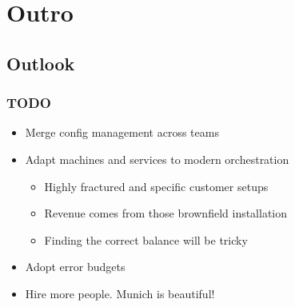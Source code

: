 \documentclass[t]{beamer}
\begin{document}


\section{Outro}

\subsection{Outlook}

\begin{frame}
	\frametitle{TODO}
	\begin{itemize}
		\item Merge config management across teams
		\item Adapt machines and services to modern orchestration
		\begin{itemize}
			\item Highly fractured and specific customer setups
			\item Revenue comes from those brownfield installation
			\item Finding the correct balance will be tricky
		\end{itemize}
		\item Adopt error budgets
		\item Hire more people. Munich is beautiful!
	\end{itemize}
\end{frame}









%
\end{document}
